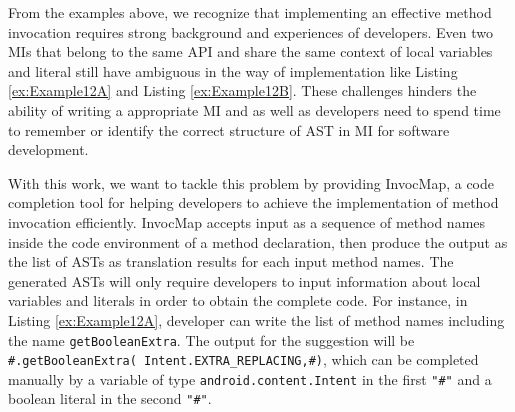 From the examples above, we recognize that implementing an effective method invocation requires strong background and experiences of developers. Even two MIs that belong to the same API and share the same context of local variables and literal still have ambiguous in the way of implementation like Listing \ref{ex:Example12A} and Listing \ref{ex:Example12B}. These challenges hinders the ability of writing a appropriate MI and as well as developers need to spend time to remember or identify the correct structure of AST in MI for software development.

With this work, we want to tackle this problem by providing InvocMap, a code completion tool for helping developers to achieve the implementation of method invocation efficiently. InvocMap accepts input as a sequence of method names inside the code environment of a method declaration, then produce the output as the list of ASTs as translation results for each input method names. The generated ASTs will only require developers to input information about local variables and literals in order to obtain the complete code. For instance, in Listing \ref{ex:Example12A}, developer can write the list of method names including the name \texttt{getBooleanExtra}. The output for the suggestion  will be \texttt{\#.getBooleanExtra( Intent.EXTRA\_REPLACING,\#)}, which can be completed manually by a variable of type \texttt{android.content.Intent} in the first \texttt{"\#"} and a boolean literal in the second \texttt{"\#"}.

